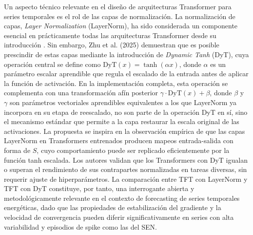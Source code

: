 Un aspecto técnico relevante en el diseño de arquitecturas Transformer para series temporales es el rol de las capas de normalización. La normalización de capas, \textit{Layer Normalization} (LayerNorm), ha sido considerada un componente esencial en prácticamente todas las arquitecturas Transformer desde su introducción \cite{Vaswani2017Attention}. Sin embargo, Zhu et al. (2025) \cite{Zhu2025Transformers} demuestran que es posible prescindir de estas capas mediante la introducción de \textit{Dynamic Tanh} (DyT), cuya operación central se define como $\text{DyT}(x) = \tanh(\alpha x)
$, donde $\alpha$ es un parámetro escalar aprendible que regula el escalado de la entrada antes de aplicar la función de activación. En la implementación completa, esta operación se complementa con una transformación afín posterior $\gamma \cdot \text{DyT}(x) + \beta$, donde $\beta$ y $\gamma$ son parámetros vectoriales aprendibles equivalentes a los que LayerNorm ya incorpora en su etapa de reescalado, no son parte de la operación DyT en sí, sino el mecanismo estándar que permite a la capa restaurar la escala original de las activaciones. La propuesta se inspira en la observación empírica de que las capas LayerNorm en Transformers entrenados producen mapeos entrada-salida con forma de $S$, cuyo comportamiento puede ser replicado eficientemente por la función tanh escalada. Los autores validan que los Transformers con DyT igualan o superan el rendimiento de sus contrapartes normalizadas en tareas diversas, sin requerir ajuste de hiperparámetros. La comparación entre TFT con LayerNorm y TFT con DyT constituye, por tanto, una interrogante abierta y metodológicamente relevante en el contexto de forecasting de series temporales energéticas, dado que las propiedades de estabilización del gradiente y la velocidad de convergencia pueden diferir significativamente en series con alta variabilidad y episodios de spike como las del SEN.

